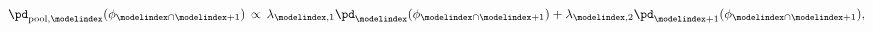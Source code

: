 \begin{gather}
  \pd_{\text{pool}, \modelindex}(\phi_{\modelindex \cap \modelindex + 1}) \, \propto \,
  \lambda_{\modelindex, 1}\pd_{\modelindex}(\phi_{\modelindex \cap \modelindex + 1}) +
  \lambda_{\modelindex, 2}\pd_{\modelindex + 1}(\phi_{\modelindex \cap \modelindex + 1}),
  \label{eqn:M-model-linear-pooling-one}
\end{gather}